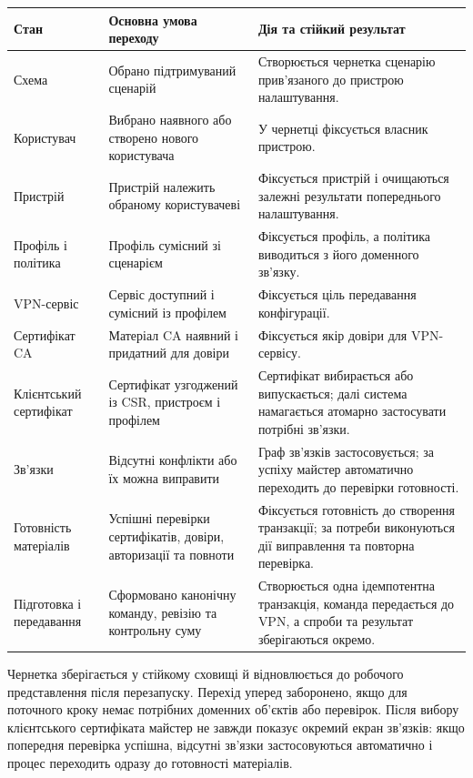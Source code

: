 \documentclass{article}
\begin{document}
\begin{longtable}{p{}p{}p{}}
\toprule
\textbf{Стан} & \textbf{Основна умова переходу} & \textbf{Дія та стійкий результат} \\
\midrule
\endhead
Схема & Обрано підтримуваний сценарій & Створюється чернетка сценарію прив'язаного до пристрою налаштування. \\
Користувач & Вибрано наявного або створено нового користувача & У чернетці фіксується власник пристрою. \\
Пристрій & Пристрій належить обраному користувачеві & Фіксується пристрій і очищаються залежні результати попереднього налаштування. \\
Профіль і політика & Профіль сумісний зі сценарієм & Фіксується профіль, а політика виводиться з його доменного зв'язку. \\
VPN-сервіс & Сервіс доступний і сумісний із профілем & Фіксується ціль передавання конфігурації. \\
Сертифікат CA & Матеріал CA наявний і придатний для довіри & Фіксується якір довіри для VPN-сервісу. \\
Клієнтський сертифікат & Сертифікат узгоджений із CSR, пристроєм і профілем & Сертифікат вибирається або випускається; далі система намагається атомарно застосувати потрібні зв'язки. \\
Зв'язки & Відсутні конфлікти або їх можна виправити & Граф зв'язків застосовується; за успіху майстер автоматично переходить до перевірки готовності. \\
Готовність матеріалів & Успішні перевірки сертифікатів, довіри, авторизації та повноти & Фіксується готовність до створення транзакції; за потреби виконуються дії виправлення та повторна перевірка. \\
Підготовка і передавання & Сформовано канонічну команду, ревізію та контрольну суму & Створюється одна ідемпотентна транзакція, команда передається до VPN, а спроби та результат зберігаються окремо. \\
\bottomrule
\end{longtable}

Чернетка зберігається у стійкому сховищі й відновлюється до робочого представлення після перезапуску. Перехід уперед заборонено, якщо для поточного кроку немає потрібних доменних об'єктів або перевірок. Після вибору клієнтського сертифіката майстер не завжди показує окремий екран зв'язків: якщо попередня перевірка успішна, відсутні зв'язки застосовуються автоматично і процес переходить одразу до готовності матеріалів.
\end{document}
